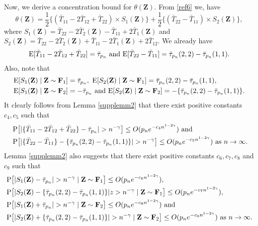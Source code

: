 \documentclass[twoside]{article}
\newcommand{\bZ}{\mathbf{Z}}
\newcommand{\bF}{\mathbf{F}}
\newcommand{\0}{\mathbf{0}}
\newcommand{\1}{\mathbf{1}}
\numberwithin{equation}{section}
\begin{document}
Now, we derive a concentration bound for $\theta(\bZ)$. From \eqref{ref6} we, have $$\theta(\bZ) = \frac{1}{2}\big \{(\bar{T}_{11}-2\bar{T}_{12}+\bar{T}_{22})\times S_1(\bZ)\big \}
 +\frac{1}{2}\big \{(\bar{T}_{22}-\bar{T}_{11})\times S_2(\bZ)\big \},$$
 where $S_1(\bZ) = \bar{T}_{22} - 2\bar{T}_2(\bZ) - \bar{T}_{11} + 2\bar{T}_1(\bZ)$ and $S_2(\bZ) = \bar{T}_{22} - 2\bar{T}_2(\bZ) + \bar{T}_{11} - 2\bar{T}_1(\bZ)+2\bar{T}_{12}$. We already have
 \begin{align*}
  {\rm E}[\bar{T}_{11}-2\bar{T}_{12}+\bar{T}_{22}]=\bar{\tau}_{p_n}\text{ and }{\rm E}[\bar{T}_{22}-\bar{T}_{11}]=\bar{\tau}_{p_n}(2,2)-\bar{\tau}_{p_n}(1,1).
 \end{align*}
Also, note that
 \begin{align*}
  &{\rm E}[S_1(\bZ)\mid\bZ\sim\bF_1]=\bar{\tau}_{p_n},\ {\rm E}[S_2(\bZ)\mid\bZ\sim\bF_1]=\bar{\tau}_{p_n}(2,2)-\bar{\tau}_{p_n}(1,1),\\
  &{\rm E}[S_1(\bZ)\mid\bZ\sim\bF_2]=-\bar{\tau}_{p_n}\text{ and } {\rm E}[S_2(\bZ)\mid\bZ\sim\bF_2]=-\{\bar{\tau}_{p_n}(2,2)-\bar{\tau}_{p_n}(1,1)\}.
 \end{align*}
It clearly follows from Lemma \ref{supplemm2} that there exist positive constants $c_4, c_5$ such that
\begin{align}\label{ref16}
 &\ {\rm P}\big [|\{\bar{T}_{11}-2\bar{T}_{12}+\bar{T}_{22}\}- \bar{\tau}_{p_n}|>n^{-\gamma}\big ]\leq O(p_ne^{-c_4 n^{1-2\gamma}})\text{ and }\nonumber \\
 &\
 {\rm P}\big [|\{\bar{T}_{22}-\bar{T}_{11}\}- \{\bar{\tau}_{p_n}(2,2)-\bar{\tau}_{p_n}(1,1)\}|>n^{-\gamma}\big ]\leq O(p_ne^{-c_5 n^{1-2\gamma}})\text{ as }n\to\infty.
\end{align}
Lemma \ref{supplemm2} also suggests that there exist positive constants $c_6,c_7,c_8$ and $c_9$ such that
\begin{align}\label{ref17}
 &{\rm P}\big [|S_1(\bZ)-\bar{\tau}_{p_n}|>n^{-\gamma}\mid \bZ\sim\bF_1\big ]\leq O(p_ne^{-c_6 n^{1-2\gamma}}),\nonumber \\
 & {\rm P}\big [|S_2(\bZ)-\{\bar{\tau}_{p_n}(2,2)-\bar{\tau}_{p_n}(1,1)\}|z>n^{-\gamma} \mid \bZ\sim\bF_1\big ]\leq O(p_ne^{-c_7 n^{1-2\gamma}}),\nonumber \\
 &{\rm P}\big [|S_1(\bZ)+\bar{\tau}_{p_n}|>n^{-\gamma}\mid \bZ\sim\bF_2\big ]\leq O(p_ne^{-c_8 n^{1-2\gamma}})\text{ and }\nonumber \\
 & {\rm P}\big [|S_2(\bZ)+\{\bar{\tau}_{p_n}(2,2)- \bar{\tau}_{p_n}(1,1)\}|>n^{-\gamma}\mid \bZ\sim\bF_2\big ]\leq O(p_ne^{-c_9 n^{1-2\gamma}})\text{ as }n\to\infty.
\end{align}
\end{document}
